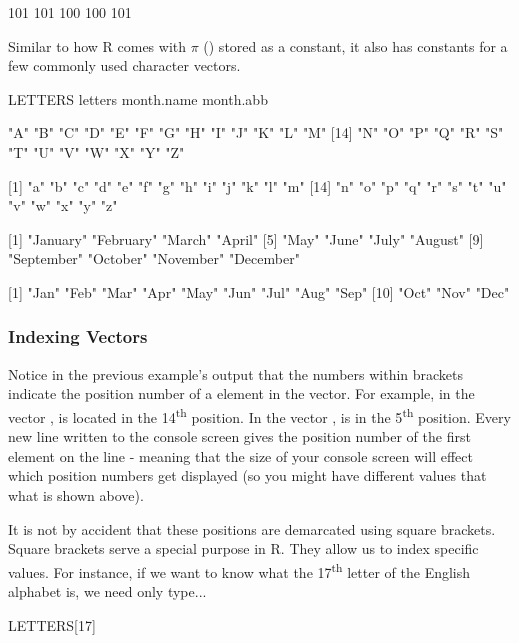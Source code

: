 \begin{outR}
[1] 101 101 100 100 101
\end{outR}

Similar to how R comes with $\pi$ () stored as a constant, it also has constants for a few commonly used character vectors.

\begin{inR}
LETTERS
letters
month.name
month.abb
\end{inR}

\begin{outR}
 [1] "A" "B" "C" "D" "E" "F" "G" "H" "I" "J" "K" "L" "M"
[14] "N" "O" "P" "Q" "R" "S" "T" "U" "V" "W" "X" "Y" "Z"

 [1] "a" "b" "c" "d" "e" "f" "g" "h" "i" "j" "k" "l" "m"
[14] "n" "o" "p" "q" "r" "s" "t" "u" "v" "w" "x" "y" "z"

 [1] "January"   "February"  "March"     "April"    
 [5] "May"       "June"      "July"      "August"   
 [9] "September" "October"   "November"  "December" 
 
 [1] "Jan" "Feb" "Mar" "Apr" "May" "Jun" "Jul" "Aug" "Sep"
[10] "Oct" "Nov" "Dec"
\end{outR}

\subsubsection{Indexing Vectors}
\label{sec:vectIndex}

Notice in the previous example's output that the numbers within brackets indicate the position number of a element in the vector.  For example, in the vector ,  is located in the 14\textsuperscript{th} position.  In the vector ,   is in the 5\textsuperscript{th} position. Every new line written to the console screen gives the position number of the first element on the line - meaning that the size of your console screen will effect which position numbers get displayed (so you might have different values that what is shown above).

It is not by accident that these positions are demarcated using square brackets.  Square brackets serve a special purpose in R.  They allow us to index specific values.  For instance, if we want to know what the 17\textsuperscript{th} letter of the English alphabet is, we need only type...

\begin{inR}
LETTERS[17]
\end{inR}

